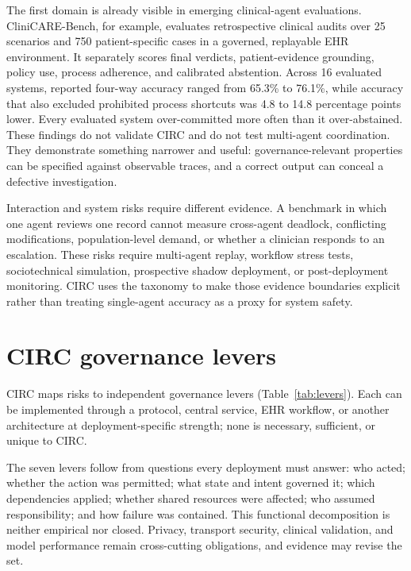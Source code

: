 \documentclass[10pt]{article}
\begin{document}
The first domain is already visible in emerging clinical-agent evaluations. CliniCARE-Bench, for
example, evaluates retrospective clinical audits over 25 scenarios and 750 patient-specific cases in
a governed, replayable EHR environment.\cite{chatrath2026clinicare} It separately scores final
verdicts, patient-evidence grounding, policy use, process adherence, and calibrated abstention. Across
16 evaluated systems, reported four-way accuracy ranged from 65.3\% to 76.1\%, while accuracy that
also excluded prohibited process shortcuts was 4.8 to 14.8 percentage points lower. Every evaluated
system over-committed more often than it over-abstained. These findings do not validate CIRC and do
not test multi-agent coordination. They demonstrate something narrower and useful: governance-relevant
properties can be specified against observable traces, and a correct output can conceal a defective
investigation.

Interaction and system risks require different evidence. A benchmark in which one agent reviews one
record cannot measure cross-agent deadlock, conflicting modifications, population-level demand, or
whether a clinician responds to an escalation. These risks require multi-agent replay, workflow stress
tests, sociotechnical simulation, prospective shadow deployment, or post-deployment monitoring. CIRC
uses the taxonomy to make those evidence boundaries explicit rather than treating single-agent
accuracy as a proxy for system safety.

\section{CIRC governance levers}

CIRC maps risks to independent governance levers (Table~\ref{tab:levers}). Each can be implemented
through a protocol, central service, EHR workflow, or another architecture at deployment-specific
strength; none is necessary, sufficient, or unique to CIRC.

The seven levers follow from questions every deployment must answer: who acted; whether the action was
permitted; what state and intent governed it; which dependencies applied; whether shared resources
were affected; who assumed responsibility; and how failure was contained. This functional
decomposition is neither empirical nor closed. Privacy, transport security, clinical validation, and
model performance remain cross-cutting obligations, and evidence may revise the set.
\end{document}

